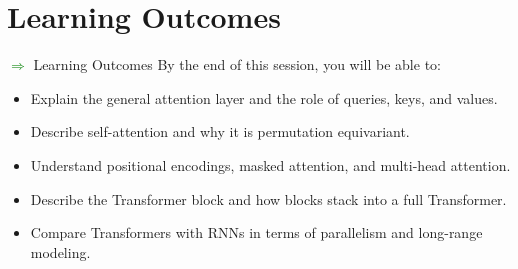 \section{Learning Outcomes}
\begin{frame}[allowframebreaks]{\textcolor{green}{$\Rightarrow$} Learning Outcomes}
    By the end of this session, you will be able to:
    \begin{itemize}
        \item Explain the general attention layer and the role of queries, keys, and values.
        \item Describe self-attention and why it is permutation equivariant.
        \item Understand positional encodings, masked attention, and multi-head attention.
        \item Describe the Transformer block and how blocks stack into a full Transformer.
        \item Compare Transformers with RNNs in terms of parallelism and long-range modeling.
    \end{itemize}
\end{frame}
